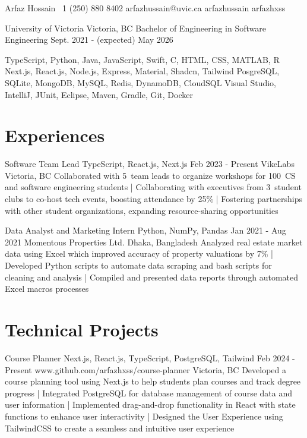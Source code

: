\documentclass[a4paper,10pt]{article}
\begin{document}
\header
{Arfaz Hossain}				%
{\plus\ 1 (250) 880 8402}		%
{arfazhussain@uvic.ca} 			%
{arfazhussain} 				%
{arfazhxss} 				%

\education
{University of Victoria}
{Victoria, BC}
{Bachelor of Engineering in Software Engineering}
{Sept. 2021 - (expected) May 2026}

\technicalskills
{TypeScript, Python, Java, JavaScript, Swift, C\plus\plus, HTML, CSS, MATLAB, R}
{Next.js, React.js, Node.js, Express, Material, Shadcn, Tailwind}
{PosgreSQL, SQLite, MongoDB, MySQL, Redis, DynamoDB, CloudSQL}
{Visual Studio, IntelliJ, JUnit, Eclipse, Maven, Gradle, Git, Docker}

\section{Experiences}
\workexperiences
{Software Team Lead}
{TypeScript, React.js, Next.js}
{Feb 2023 - Present}
{VikeLabs}
{Victoria, BC}
{Collaborated with 5\plus\ team leads to organize workshops for 100\plus\ CS and software engineering students 
| Collaborating with executives from 3\plus\ student clubs to co-host tech events, boosting attendance by 25\% 
| Fostering partnerships with other student organizations, expanding resource-sharing opportunities 
}

\workexperiences
{Data Analyst and Marketing Intern}
{Python, NumPy, Pandas}
{Jan 2021 - Aug 2021}
{Momentous Properties Ltd.}
{Dhaka, Bangladesh}
{Analyzed real estate market data using Excel which improved accuracy of property valuations by 7\% 
| Developed Python scripts to automate data scraping and bash scripts for cleaning and analysis
| Compiled and presented data reports through automated Excel macros processes
}

\section{Technical Projects}
\projectentry
{Course Planner}
{Next.js, React.js, TypeScript, PostgreSQL, Tailwind}
{Feb 2024 - Present}
{www.github.com/arfazhxss/course-planner}
{Victoria, BC}
{Developed a course planning tool using Next.js to help students plan courses and track degree progress 
| Integrated PostgreSQL for database management of course data and user information 
| Implemented drag-and-drop functionality in React with state functions to enhance user interactivity 
| Designed the User Experience using TailwindCSS to create a seamless and intuitive user experience
}
\end{document}
